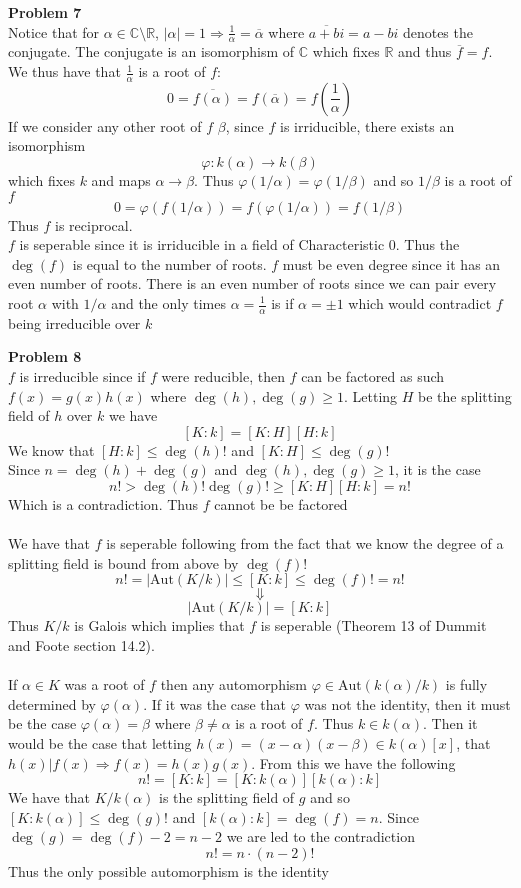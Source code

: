 \documentclass[12pt]{article}
\newenvironment{ques}[1]{\textbf{Problem #1}\vspace{1 mm}\\ }{\bigskip}
\theoremstyle{definition}
\newcommand{\R}{\mathbb R}
\newcommand{\C}{\mathbb C}
\renewcommand{\a}{\alpha}
\renewcommand{\b}{\beta}
\newcommand{\Aut}{\text{Aut}}
\begin{document}
\begin{ques}{7}
	Notice that for $\a \in \C \setminus \R$, $|\a| = 1 \Rightarrow \frac 1 \a
	= \overline \a$ where $\overline{a + bi} = a - bi$ denotes the conjugate.
	The conjugate is an isomorphism of $\C$ which fixes $\R$ and thus
	$\overline f = f$. We thus have that $\frac 1 \a$ is a root of $f$: 
	$$0 = \overline {f(\a)} = f(\overline \a) = f(\frac 1 \a)$$
	If we consider any other root of $f$ $\beta$, since $f$ is irriducible,
	there exists an isomorphism
	$$\varphi :k(\a) \to k(\beta)$$
	which fixes $k$ and maps $\a \to \b$. Thus $\varphi(1/\a) = \varphi(1/\b)$ and so
	$1/\b$ is a root of $f$
	$$0 = \varphi(f(1/\a)) = f(\varphi(1/\a)) = f(1/\b)$$
	Thus $f$ is reciprocal. \\
	$f$ is seperable since it is irriducible in a field
	of Characteristic $0$. Thus the $\deg(f)$ is equal to the number of roots.
	$f$ must be even degree since it has an even number of roots. There is
	an even number of roots since we can pair every root $\a$ with $1/\a$ and
	the only times $\a = \frac 1 \a$ is if $\a = \pm 1$ which would contradict
	$f$ being irreducible over $k$
\end{ques}

\begin{ques}{8}
	$f$ is irreducible since if $f$ were reducible, then $f$ can be factored as
	such $f(x) = g(x)h(x)$ where $\deg(h),\deg(g) \geq 1$.  Letting $H$ be the
	splitting field of $h$ over $k$ we have 
	$$[K:k] = [K:H][H:k]$$
	We know that $[H:k] \leq \deg(h)!$ and $[K:H] \leq \deg(g)!$\\
	Since
	$n = \deg(h) + \deg(g)$ and $\deg(h),\deg(g) \geq 1$, it is the case
	$$n! > \deg(h)! \deg(g)! \geq [K:H][H:k] = n!$$
	Which is a contradiction. Thus $f$ cannot be be factored\\
	\\
	We have that $f$ is seperable following from the fact that we know the
	degree of a splitting field is bound from above by $\deg(f)!$
	$$n! = |\Aut(K/k)| \leq [K:k] \leq \deg(f)! = n!$$
	$$\Downarrow$$
	$$|\Aut(K/k)| = [K:k]$$
	Thus $K/k$ is Galois which implies that $f$ is seperable (Theorem 13 of
	Dummit and Foote section 14.2).\\
	\\
	If $\a \in K$ was a root of $f$ then any automorphism $\varphi \in
	\Aut(k(\a)/k)$ is fully determined by
	$\varphi(\a)$. If it was the case that $\varphi$ was not the identity, then
	it must be the case $\varphi(\a) = \beta$ where $\beta \neq \a$ is a root of $f$.
	Thus $k \in k(\a)$. Then it would be the case that letting $h(x) =
	(x-\a)(x-\b) \in k(\a)[x]$, that $h(x)|f(x) \Rightarrow f(x) = h(x)g(x)$.
	From this we have the following
	$$n! = [K:k] = [K:k(\a)][k(\a):k]$$
	We have that $K/k(\a)$ is the splitting field of $g$ and so $[K:k(\a)]
	\leq \deg(g)!$ and $[k(\a):k] = \deg(f) = n$. Since $\deg(g) = \deg(f) -
	2 = n-2$ we are led to the contradiction
	$$n! = n \cdot (n-2)!$$
	Thus the only possible automorphism is the identity\\
\end{ques}
\end{document}

